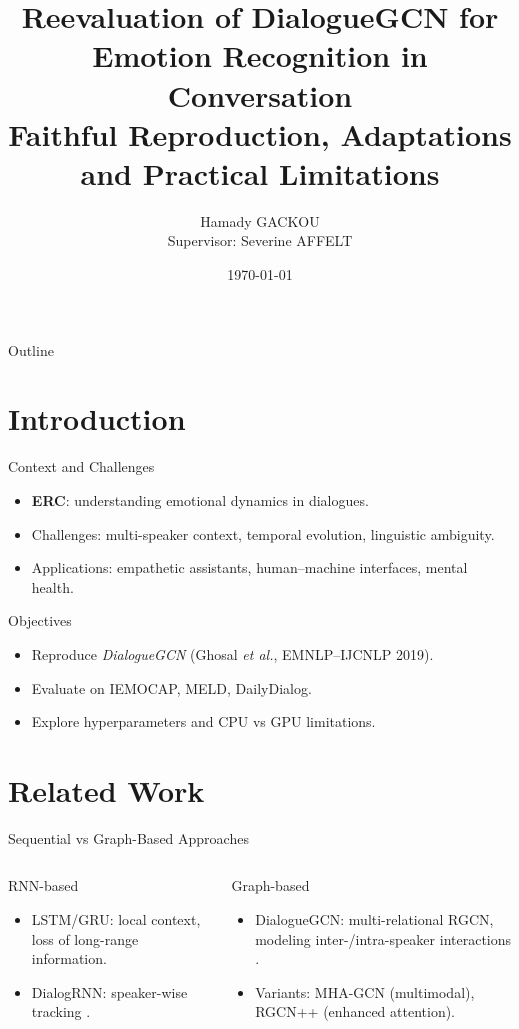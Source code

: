 \documentclass[10pt,aspectratio=169]{beamer}
\title[Reevaluation of DialogueGCN]{\Large Reevaluation of DialogueGCN for Emotion Recognition in Conversation\\Faithful Reproduction, Adaptations and Practical Limitations}
\author[Hamady GACKOU]{Hamady GACKOU\\\small Supervisor: Severine AFFELT}
\institute{Universite Paris Cite \\ Master 1 AMSD}
\date{\today}
\begin{document}
\begin{frame}[plain]
  \titlepage
\end{frame}

\begin{frame}{Outline}
  \tableofcontents
\end{frame}

\section{Introduction}
\begin{frame}{Context and Challenges}
  \begin{itemize}
    \item \textbf{ERC}: understanding emotional dynamics in dialogues.
    \item Challenges: multi-speaker context, temporal evolution, linguistic ambiguity.
    \item Applications: empathetic assistants, human--machine interfaces, mental health.
  \end{itemize}
  \vfill
  \begin{block}{Objectives}
    \begin{itemize}
      \item Reproduce \emph{DialogueGCN} (Ghosal \emph{et al.}, EMNLP--IJCNLP 2019).
      \item Evaluate on IEMOCAP, MELD, DailyDialog.
      \item Explore hyperparameters and CPU vs GPU limitations.
    \end{itemize}
  \end{block}
\end{frame}

\section{Related Work}
\begin{frame}{Sequential vs Graph-Based Approaches}
  \begin{columns}
    \begin{block}{RNN-based}
      \begin{itemize}
        \item LSTM/GRU: local context, loss of long-range information.
        \item DialogRNN: speaker-wise tracking \cite{majumder2019dialoguernn}.
      \end{itemize}
    \end{block}
    \begin{block}{Graph-based}
      \begin{itemize}
        \item DialogueGCN: multi-relational RGCN, modeling inter-/intra-speaker interactions \cite{ghosal2019dialoguegcn}.
        \item Variants: MHA-GCN (multimodal), RGCN++ (enhanced attention).
      \end{itemize}
    \end{block}
  \end{columns}
\end{frame}
\end{document}
